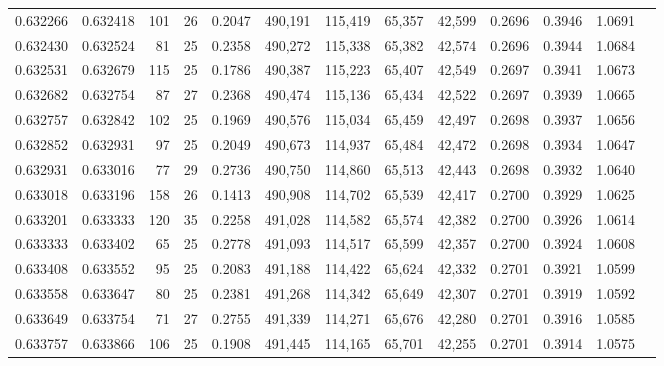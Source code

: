 \begin{tabular}{rrrrrrrrrrrrr}
0.632266 & 0.632418 &   101 &  26 &                                     0.2047 & 490,191 & 115,419 &  65,357 &  42,599 & 0.2696 & 0.3946 & 1.0691 \\
0.632430 & 0.632524 &    81 &  25 &                                     0.2358 & 490,272 & 115,338 &  65,382 &  42,574 & 0.2696 & 0.3944 & 1.0684 \\
0.632531 & 0.632679 &   115 &  25 &                                     0.1786 & 490,387 & 115,223 &  65,407 &  42,549 & 0.2697 & 0.3941 & 1.0673 \\
0.632682 & 0.632754 &    87 &  27 &                                     0.2368 & 490,474 & 115,136 &  65,434 &  42,522 & 0.2697 & 0.3939 & 1.0665 \\
0.632757 & 0.632842 &   102 &  25 &                                     0.1969 & 490,576 & 115,034 &  65,459 &  42,497 & 0.2698 & 0.3937 & 1.0656 \\
0.632852 & 0.632931 &    97 &  25 &                                     0.2049 & 490,673 & 114,937 &  65,484 &  42,472 & 0.2698 & 0.3934 & 1.0647 \\
0.632931 & 0.633016 &    77 &  29 &                                     0.2736 & 490,750 & 114,860 &  65,513 &  42,443 & 0.2698 & 0.3932 & 1.0640 \\
0.633018 & 0.633196 &   158 &  26 &                                     0.1413 & 490,908 & 114,702 &  65,539 &  42,417 & 0.2700 & 0.3929 & 1.0625 \\
0.633201 & 0.633333 &   120 &  35 &                                     0.2258 & 491,028 & 114,582 &  65,574 &  42,382 & 0.2700 & 0.3926 & 1.0614 \\
0.633333 & 0.633402 &    65 &  25 &                                     0.2778 & 491,093 & 114,517 &  65,599 &  42,357 & 0.2700 & 0.3924 & 1.0608 \\
0.633408 & 0.633552 &    95 &  25 &                                     0.2083 & 491,188 & 114,422 &  65,624 &  42,332 & 0.2701 & 0.3921 & 1.0599 \\
0.633558 & 0.633647 &    80 &  25 &                                     0.2381 & 491,268 & 114,342 &  65,649 &  42,307 & 0.2701 & 0.3919 & 1.0592 \\
0.633649 & 0.633754 &    71 &  27 &                                     0.2755 & 491,339 & 114,271 &  65,676 &  42,280 & 0.2701 & 0.3916 & 1.0585 \\
0.633757 & 0.633866 &   106 &  25 &                                     0.1908 & 491,445 & 114,165 &  65,701 &  42,255 & 0.2701 & 0.3914 & 1.0575 \\

\end{tabular}
